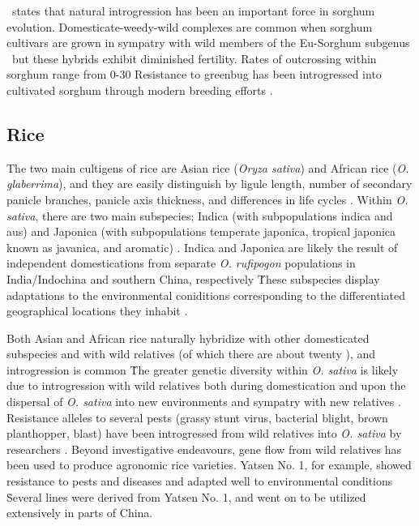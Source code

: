 \documentclass[11pt]{article}
\begin{document}
\cite{po1982sorghum}\ states that natural introgression has been an important force in sorghum evolution.
Domesticate-weedy-wild complexes are common when sorghum cultivars are grown in sympatry with wild members of the Eu-Sorghum subgenus \cite{de1978systematics, doggett1968disruptive, baker1972human}\, but these hybrids exhibit diminished fertility.
Rates of outcrossing within sorghum range from 0-30%
Resistance to greenbug has been introgressed into cultivated sorghum through modern breeding efforts \cite{johnson1979breeding}.




\subsection*{Rice}

The two main cultigens of rice are Asian rice (\emph{Oryza sativa}) and African rice (\emph{O. glaberrima}), and they are easily distinguish by ligule length, number of secondary panicle branches, panicle axis thickness, and differences in life cycles \cite{oka2012origin}.
Within \emph{O. sativa}, there are two main subspecies; Indica (with subpopulations indica and aus) and Japonica (with subpopulations temperate japonica, tropical japonica known as javanica, and aromatic) \cite{chang2003origin, glaszmann1987isozymes, ricepedia}.
Indica and Japonica are likely the result of independent domestications from separate \emph{O. rufipogon} populations in India/Indochina and southern China, respectively \cite{londo2006phylogeography}\.
These subspecies display adaptations to the environmental coniditions corresponding to the differentiated geographical locations they inhabit \cite{khush2003classifying}.

Both Asian and African rice naturally hybridize with other domesticated subspecies and with wild relatives (of which there are about twenty \cite{ricepedia}), and introgression is common \cite{oka2012origin, second1982origin, zhao2010genomic}\.
The greater genetic diversity within \emph{O. sativa} is likely due to introgression with wild relatives both during domestication and upon the dispersal of \emph{O. sativa} into new environments and sympatry with new relatives \cite{second1982origin}.
Resistance alleles to several pests (grassy stunt virus, bacterial blight, brown planthopper, blast) have been introgressed from wild relatives into \emph{O. sativa} by researchers \cite{brar1997alien, khush1974inheritance}.
Beyond investigative endeavours, gene flow from wild relatives has been used to produce agronomic rice varieties.
Yatsen No. 1, for example, showed resistance to pests and diseases and adapted well to environmental conditions \cite{ting1933wild}\.
Several lines were derived from Yatsen No. 1, and went on to be utilized extensively in parts of China.
\end{document}
